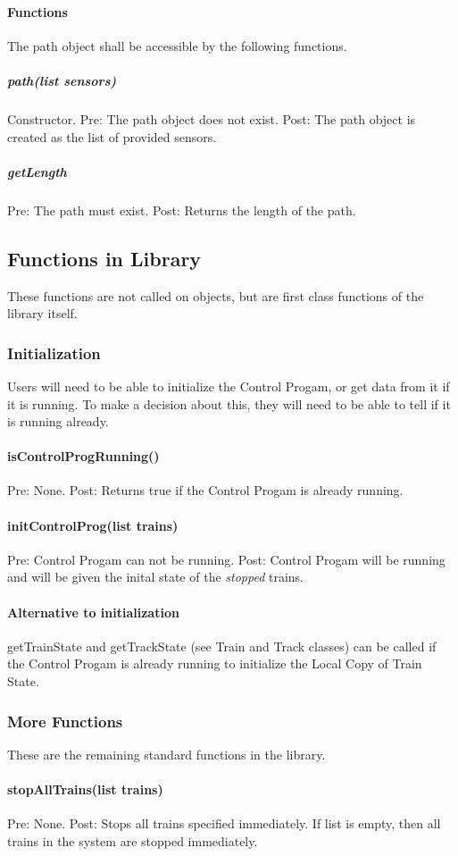 \documentclass[a4paper,11pt,notitlepage]{article}
\def\CS{Control Progam\xspace} \def\LC{Local Copy of Train State\xspace} \def\TN{Track Node\xspace}
\begin{document}
\paragraph{Functions}
The path object shall be accessible by the following functions.
\subparagraph{path(list sensors)} Constructor. Pre: The path object does not exist. Post: The path object is created as the list of provided sensors.
\subparagraph{getLength} Pre: The path must exist. Post: Returns the length of the path.


\subsection{Functions in Library}
These functions are not called on objects, but are first class functions of the library itself.

\subsubsection{Initialization}
Users will need to be able to initialize the \CS, or get data from it if it is running. To make a decision about this, they will need to be able to tell if it is running already.
\paragraph{isControlProgRunning()} Pre: None. Post: Returns true if the \CS is already running.
\paragraph{initControlProg(list trains)} Pre: \CS can not be running. Post: \CS will be running and will be given the inital state of the \emph{stopped} trains.
\paragraph{Alternative to initialization} getTrainState and getTrackState (see Train and Track classes) can be called if the \CS is already running to initialize the \LC.
\subsubsection{More Functions}
These are the remaining standard functions in the library.
\paragraph{stopAllTrains(list trains)} Pre: None. Post: Stops all trains specified immediately. If list is empty, then all trains in the system are stopped immediately.
\end{document}
